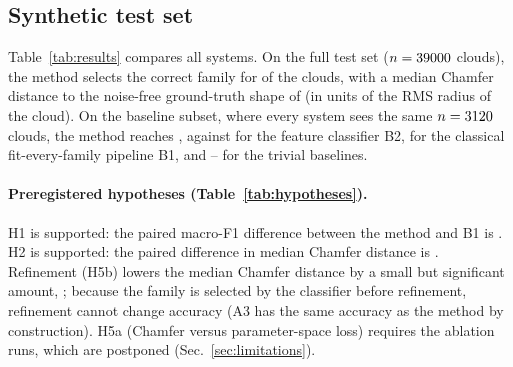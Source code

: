 
\subsection{Synthetic test set}
Table~\ref{tab:results} compares all systems. On the full test set ($n=39000$ clouds), the method selects the correct family for \accMethod{} \accCIMethod{} of the clouds, with a median Chamfer distance to the noise-free ground-truth shape of \cdMethod{} \cdCIMethod{} (in units of the RMS radius of the cloud). On the baseline subset, where every system sees the same $n=3120$ clouds, the method reaches \accMethodsub{}, against \accBtwo{} for the feature classifier B2, \accBone{} for the classical fit-every-family pipeline B1, and \accBthreea{}--\accBthreec{} for the trivial baselines.

\begin{table}[tbp]
\centering
\caption{Synthetic test set. Fine accuracy is the exact family; coarse accuracy is the shape dimension (point set, curve, surface, blob). Chamfer is the median symmetric Chamfer distance between the selected, refined shape and the noise-free ground-truth shape. Baselines and the ``baseline subset'' row use the same 20 clouds per family and cell. 95\% percentile-bootstrap CIs. The full table (superset-tolerant accuracy, residual, axis error) is in \texttt{reports/exp01\_synthetic.md}.}
\label{tab:results}
\resizebox{\textwidth}{!}{}
\end{table}

\paragraph{Preregistered hypotheses (Table~\ref{tab:hypotheses}).} H1 is supported: the paired macro-F1 difference between the method and B1 is \estHone{} \ciHone{}. H2 is supported: the paired difference in median Chamfer distance is \estHtwo{} \ciHtwo{}. Refinement (H5b) lowers the median Chamfer distance by a small but significant amount, \estHfivebrefinement{} \ciHfivebrefinement{}; because the family is selected by the classifier before refinement, refinement cannot change accuracy (A3 has the same accuracy as the method by construction). H5a (Chamfer versus parameter-space loss) requires the ablation runs, which are postponed (Sec.~\ref{sec:limitations}).

